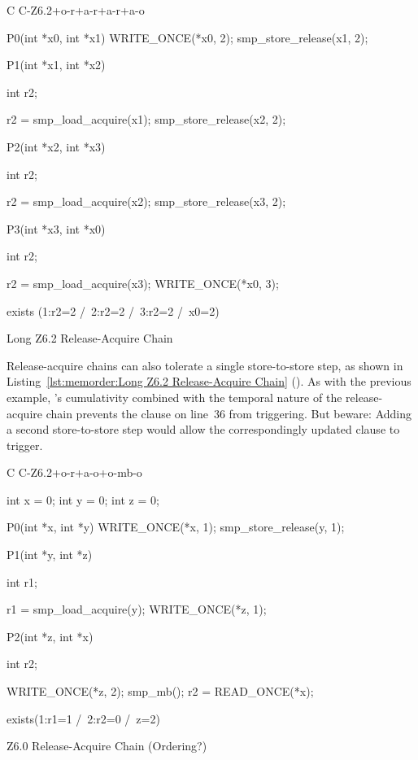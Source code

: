 \begin{listing}[tbp]
{ \scriptsize
\begin{verbbox}[\LstLineNo]
C C-Z6.2+o-r+a-r+a-r+a-o
{
}

P0(int *x0, int *x1)
{
  WRITE_ONCE(*x0, 2);
  smp_store_release(x1, 2);
}


P1(int *x1, int *x2)
{
  int r2;

  r2 = smp_load_acquire(x1);
  smp_store_release(x2, 2);
}

P2(int *x2, int *x3)
{
  int r2;

  r2 = smp_load_acquire(x2);
  smp_store_release(x3, 2);
}

P3(int *x3, int *x0)
{
  int r2;

  r2 = smp_load_acquire(x3);
  WRITE_ONCE(*x0, 3);
}

exists (1:r2=2 /\ 2:r2=2 /\ 3:r2=2 /\ x0=2)
\end{verbbox}
}
\centering
\theverbbox
\caption{Long Z6.2 Release-Acquire Chain}
\label{lst:memorder:Long Z6.2 Release-Acquire Chain}
\end{listing}

Release-acquire chains can also tolerate a single store-to-store step,
as shown in
Listing~\ref{lst:memorder:Long Z6.2 Release-Acquire Chain}
().
As with the previous example, 's cumulativity
combined with the temporal nature of the release-acquire chain
prevents the  clause on line~36 from triggering.
But beware: Adding a second store-to-store step would allow the correspondingly
updated  clause to trigger.

\begin{listing}[tbp]
{ \scriptsize
\begin{verbbox}[\LstLineNo]
C C-Z6.2+o-r+a-o+o-mb-o

{
int x = 0;
int y = 0;
int z = 0;
}

P0(int *x, int *y)
{
  WRITE_ONCE(*x, 1);
  smp_store_release(y, 1);
}

P1(int *y, int *z)
{
  int r1;

  r1 = smp_load_acquire(y);
  WRITE_ONCE(*z, 1);
}

P2(int *z, int *x)
{
  int r2;

  WRITE_ONCE(*z, 2);
  smp_mb();
  r2 = READ_ONCE(*x);
}

exists(1:r1=1 /\ 2:r2=0 /\ z=2)
\end{verbbox}
}
\centering
\theverbbox
\caption{Z6.0 Release-Acquire Chain (Ordering?)}
\label{lst:memorder:Z6.0 Release-Acquire Chain (Ordering?)}
\end{listing}

